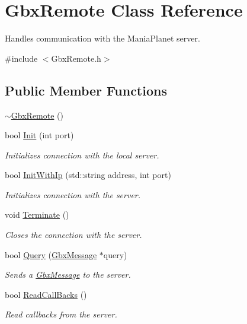 \hypertarget{classGbxRemote}{\section{Gbx\-Remote Class Reference}
\label{classGbxRemote}
}


Handles communication with the Mania\-Planet server.  




{\ttfamily \#include $<$Gbx\-Remote.\-h$>$}

\subsection*{Public Member Functions}
\begin{DoxyCompactItemize}
\item 
\hyperlink{classGbxRemote_a9ac65a51eb6f9127337b4f99841cfe2d}{$\sim$\-Gbx\-Remote} ()
\item 
bool \hyperlink{classGbxRemote_a24d9d0df923ed85010f53dcb43c2b977}{Init} (int port)
\begin{DoxyCompactList}\small\item\em Initializes connection with the local server. \end{DoxyCompactList}\item 
bool \hyperlink{classGbxRemote_aa9a57e73f2f5ebbde90484503bd0d16d}{Init\-With\-Ip} (std\-::string address, int port)
\begin{DoxyCompactList}\small\item\em Initializes connection with the server. \end{DoxyCompactList}\item 
void \hyperlink{classGbxRemote_a6fa8ca2d48aae84884cab98a0adf4360}{Terminate} ()
\begin{DoxyCompactList}\small\item\em Closes the connection with the server. \end{DoxyCompactList}\item 
bool \hyperlink{classGbxRemote_abf869640136958fc4756b3a60275a285}{Query} (\hyperlink{classGbxMessage}{Gbx\-Message} $\ast$query)
\begin{DoxyCompactList}\small\item\em Sends a \hyperlink{classGbxMessage}{Gbx\-Message} to the server. \end{DoxyCompactList}\item 
bool \hyperlink{classGbxRemote_ac595861af2f4d7349ce3841f0758507d}{Read\-Call\-Backs} ()
\begin{DoxyCompactList}\small\item\em Read callbacks from the server. \end{DoxyCompactList}\item 

\end{DoxyCompactItemize}
